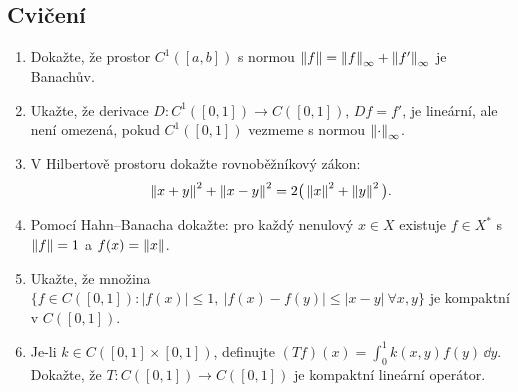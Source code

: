 \subsection*{Cvičení}
\begin{enumerate}
\item Dokažte, že prostor $C^1([a,b])$ s normou $\left\lVert f \right\rVert=\left\lVert f \right\rVert_\infty+\left\lVert f' \right\rVert_\infty$ je Banachův.
\item Ukažte, že derivace $D:C^1([0,1])\to C([0,1])$, $Df=f'$, je lineární, ale není omezená, pokud $C^1([0,1])$ vezmeme s normou $\left\lVert \cdot \right\rVert_\infty$.
\item V Hilbertově prostoru dokažte rovnoběžníkový zákon:
\[
\left\lVert x+y \right\rVert^2+\left\lVert x-y \right\rVert^2=2\big(\left\lVert x \right\rVert^2+\left\lVert y \right\rVert^2\big).
\]
\item Pomocí Hahn–Banacha dokažte: pro každý nenulový $x\in X$ existuje $f\in X^*$ s $\left\lVert f \right\rVert=1$ a $f(x)=\left\lVert x \right\rVert$.
\item Ukažte, že množina $\{f\in C([0,1]) : |f(x)|\le1,\ |f(x)-f(y)|\le |x-y|\ \forall x,y\}$ je kompaktní v $C([0,1])$.
\item Je-li $k\in C([0,1]\times[0,1])$, definujte $(Tf)(x)=\int_0^1 k(x,y)f(y)\,\dd y$. Dokažte, že $T:C([0,1])\to C([0,1])$ je kompaktní lineární operátor.
\end{enumerate}
